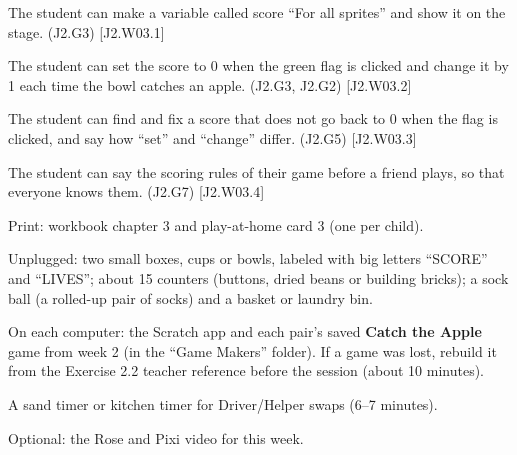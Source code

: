 
\begin{objectives}
  \item The student can make a variable called score \enquote{For all sprites} and show it on the stage. (J2.G3) [J2.W03.1]
  \item The student can set the score to 0 when the green flag is clicked and change it by 1 each time the bowl catches an apple. (J2.G3, J2.G2) [J2.W03.2]
  \item The student can find and fix a score that does not go back to 0 when the flag is clicked, and say how \enquote{set} and \enquote{change} differ. (J2.G5) [J2.W03.3]
  \item The student can say the scoring rules of their game before a friend plays, so that everyone knows them. (J2.G7) [J2.W03.4]
\end{objectives}

\begin{materials}
  \item Print: workbook chapter 3 and play-at-home card 3 (one per child).
  \item Unplugged: two small boxes, cups or bowls, labeled with big letters \enquote{SCORE} and \enquote{LIVES}; about 15 counters (buttons, dried beans or building bricks); a sock ball (a rolled-up pair of socks) and a basket or laundry bin.
  \item On each computer: the Scratch app and each pair's saved \textbf{Catch the Apple} game from week 2 (in the \enquote{Game Makers} folder). If a game was lost, rebuild it from the Exercise 2.2 teacher reference before the session (about 10 minutes).
  \item A sand timer or kitchen timer for Driver/Helper swaps (6--7 minutes).
  \item Optional: the Rose and Pixi video for this week.
\end{materials}

